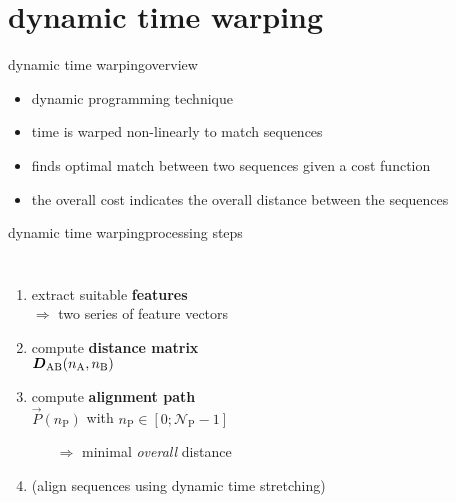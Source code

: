     \section[DTW]{dynamic time warping}
        \begin{frame}{dynamic time warping}{overview}
            \begin{itemize}
                \item   dynamic programming technique
                \smallskip
                \item   time is warped non-linearly to match sequences
                \smallskip
                \item   finds optimal match between two sequences given a cost function
                \smallskip
                \item   the overall cost indicates the overall distance between the sequences
            \end{itemize}
        \end{frame}
        \begin{frame}{dynamic time warping}{processing steps}
            \vspace{-3mm}
            \begin{columns}[T]
                \begin{enumerate}
                    \item   extract suitable \textbf{features}\\ $\Rightarrow$ two series of feature vectors
                    \smallskip
                    \item<1->	compute \textbf{distance matrix}\\ $\mat{D}_{\mathrm{AB}}(n_\mathrm{A},n_\mathrm{B})$
                    \smallskip
                    \item<1->	compute \textbf{alignment path}\\ $\vec{P}(n_\mathrm{P})$ with $n_\mathrm{P} \in
                [0;\mathcal{N}_{\mathrm{P}}-1]$
                        \begin{itemize}
                            \item[$\Rightarrow$]	minimal \textit{overall} distance
                        \end{itemize}
                    \smallskip
                    \item<1->   (align sequences using dynamic time stretching)
                \end{enumerate}
                \vspace{-7mm}
            \end{columns}
        \end{frame}
